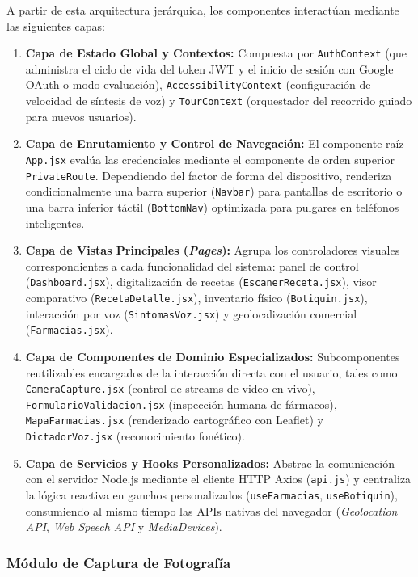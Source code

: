 A partir de esta arquitectura jerárquica, los componentes interactúan mediante las siguientes capas:
\begin{enumerate}
    \item \textbf{Capa de Estado Global y Contextos:} Compuesta por \texttt{AuthContext} (que administra el ciclo de vida del token JWT y el inicio de sesión con Google OAuth o modo evaluación), \texttt{AccessibilityContext} (configuración de velocidad de síntesis de voz) y \texttt{TourContext} (orquestador del recorrido guiado para nuevos usuarios).
    \item \textbf{Capa de Enrutamiento y Control de Navegación:} El componente raíz \texttt{App.jsx} evalúa las credenciales mediante el componente de orden superior \texttt{PrivateRoute}. Dependiendo del factor de forma del dispositivo, renderiza condicionalmente una barra superior (\texttt{Navbar}) para pantallas de escritorio o una barra inferior táctil (\texttt{BottomNav}) optimizada para pulgares en teléfonos inteligentes.
    \item \textbf{Capa de Vistas Principales (\emph{Pages}):} Agrupa los controladores visuales correspondientes a cada funcionalidad del sistema: panel de control (\texttt{Dashboard.jsx}), digitalización de recetas (\texttt{EscanerReceta.jsx}), visor comparativo (\texttt{RecetaDetalle.jsx}), inventario físico (\texttt{Botiquin.jsx}), interacción por voz (\texttt{SintomasVoz.jsx}) y geolocalización comercial (\texttt{Farmacias.jsx}).
    \item \textbf{Capa de Componentes de Dominio Especializados:} Subcomponentes reutilizables encargados de la interacción directa con el usuario, tales como \texttt{CameraCapture.jsx} (control de streams de video en vivo), \texttt{FormularioValidacion.jsx} (inspección humana de fármacos), \texttt{MapaFarmacias.jsx} (renderizado cartográfico con Leaflet) y \texttt{DictadorVoz.jsx} (reconocimiento fonético).
    \item \textbf{Capa de Servicios y Hooks Personalizados:} Abstrae la comunicación con el servidor Node.js mediante el cliente HTTP Axios (\texttt{api.js}) y centraliza la lógica reactiva en ganchos personalizados (\texttt{useFarmacias}, \texttt{useBotiquin}), consumiendo al mismo tiempo las APIs nativas del navegador (\emph{Geolocation API}, \emph{Web Speech API} y \emph{MediaDevices}).
\end{enumerate}

\subsubsection{Módulo de Captura de Fotografía}

